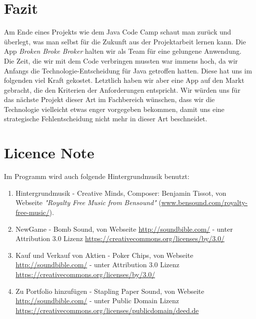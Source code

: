 \documentclass[10pt]{scrartcl}
\begin{document}
	
	
	
\section{Fazit}

Am Ende eines Projekts wie dem Java Code Camp schaut man zurück und überlegt, was man selbst für die Zukunft aus der Projektarbeit lernen kann. Die App \textit{Broken Broke Broker} halten wir als Team für eine gelungene Anwendung. Die Zeit, die wir mit dem Code verbringen mussten war immens hoch, da wir Anfangs die Technologie-Entscheidung für Java getroffen hatten. Diese hat uns im folgenden viel Kraft gekostet. Letztlich haben wir aber eine App auf den Markt gebracht, die den Kriterien der Anforderungen entspricht. Wir würden uns für das nächste Projekt dieser Art im Fachbereich wünschen, dass wir die Technologie vielleicht etwas enger vorgegeben bekommen, damit uns eine strategische Fehlentscheidung nicht mehr in dieser Art beschneidet.

\newpage
\appendix
\section{Licence Note}
Im Programm wird auch folgende Hintergrundmusik benutzt:
\begin{enumerate}
	\item Hintergrundmusik - Creative Minds, Composer: Benjamin Tissot, von Webseite \textit{"Royalty Free Music from Bensound"} (\url{www.bensound.com/royalty-free-music/}).
	\item NewGame - Bomb Sound, von Webseite \url{http://soundbible.com/} - unter Attribution 3.0 Lizenz \url{https://creativecommons.org/licenses/by/3.0/}
	\item Kauf und Verkauf von Aktien - Poker Chips, von Webseite \url{http://soundbible.com/} - unter Attribution 3.0 Lizenz \url{https://creativecommons.org/licenses/by/3.0/}
	\item Zu Portfolio hinzufügen - Stapling Paper Sound, von Webseite \url{http://soundbible.com/} - unter Public Domain Lizenz \url{https://creativecommons.org/licenses/publicdomain/deed.de}
\end{enumerate}


\newpage
\listoffigures
\end{document}
